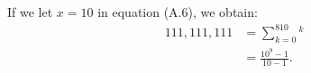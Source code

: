 If we let $x=10$ in equation (A.6), we obtain:
\begin{align*}
    111{,}111{,}111 &= \sum_{k=0}^810^k \\
    &= \frac{10^9-1}{10-1}.
\end{align*}
